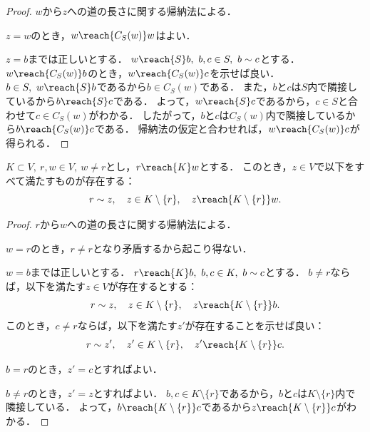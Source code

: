 \begin{proof}
  $w$から$z$への道の長さに関する帰納法による．

  $z = w$のとき，$w \reach{C_S(w)} w$はよい．

  $z = b$までは正しいとする．
  $w \reach{S} b,\ b, c \in S,\ b \sim c$とする．
  $w \reach{C_S(w)} b$のとき，$w \reach{C_S(w)} c$を示せば良い．
  $b \in S,\ w \reach{S} b$であるから$b \in C_S(w)$である．
  また，$b$と$c$は$S$内で隣接しているから$b \reach{S} c$である．
  よって，$w \reach{S} c$であるから，$c \in S$と合わせて$c \in C_S(w)$がわかる．
  したがって，$b$と$c$は$C_S(w)$内で隣接しているから$b \reach{C_S(w)} c$である．
  帰納法の仮定と合わせれば，$w \reach{C_S(w)} c$が得られる．
\end{proof}

\begin{lemma}
  \label{lem:exists_first_neighbor}
  \leanok
  \uses{}
  $K \subset V,\ r, w \in V,\ w \ne r$とし，$r \reach{K} w$とする．
  このとき，$z \in V$で以下をすべて満たすものが存在する：
  \begin{equation}
    r \sim z,\quad z \in K \setminus\{r\},\quad z \reach{K \setminus \{r\}} w.
  \end{equation}
\end{lemma}

\begin{proof}
  $r$から$w$への道の長さに関する帰納法による．

  $w = r$のとき，$r \ne r$となり矛盾するから起こり得ない．

  $w = b$までは正しいとする．
  $r \reach{K} b,\ b, c \in K,\ b \sim c$とする．
  $b \ne r$ならば，以下を満たす$z \in V$が存在するとする：
  \begin{equation}
    r \sim z,\quad z \in K \setminus\{r\},\quad z \reach{K \setminus \{r\}} b.
  \end{equation}
  このとき，$c \ne r$ならば，以下を満たす$z'$が存在することを示せば良い：
  \begin{equation}
    r \sim z',\quad z' \in K \setminus\{r\},\quad z' \reach{K \setminus \{r\}} c.
  \end{equation}
  
  $b = r$のとき，$z' = c$とすればよい．
  
  $b \ne r$のとき，$z' = z$とすればよい．
  $b, c \in K \setminus \{r\}$であるから，$b$と$c$は$K \setminus \{r\}$内で隣接している．
  よって，$b \reach{K \setminus \{r\}} c$であるから$z \reach{K \setminus \{r\}} c$がわかる．
\end{proof}